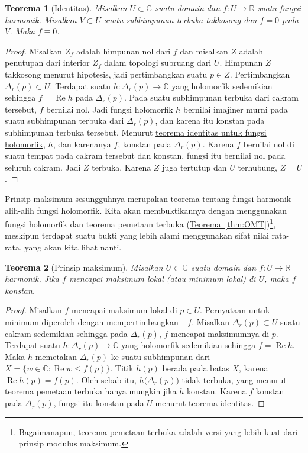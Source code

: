 \documentclass[12pt,openany]{book}
\renewcommand{\Re}{\operatorname{Re}}
\newcommand{\C}{{\mathbb{C}}}
\newcommand{\R}{{\mathbb{R}}}
\theoremstyle{plain}
\newtheorem{thm}{Teorema}[section]
\theoremstyle{remark}
\theoremstyle{definition}
\theoremstyle{exercise}
\theoremstyle{example}
\newcommand{\thmref}[1]{\hyperref[#1]{Teorema~\ref*{#1}}}
\begin{document}
\begin{thm}[Identitas]
Misalkan $U \subset \C$ suatu domain dan $f \colon U \to \R$ suatu fungsi harmonik.
Misalkan $V \subset U$ suatu subhimpunan terbuka takkosong dan $f = 0$ pada $V$. Maka $f
\equiv 0$.
\end{thm}

\begin{proof}
Misalkan $Z_f$ adalah himpunan nol dari $f$ dan misalkan $Z$ adalah penutupan dari interior
$Z_f$ dalam topologi subruang dari $U$.
Himpunan $Z$ takkosong menurut hipotesis, jadi
pertimbangkan suatu $p \in Z$. Pertimbangkan $\Delta_r(p) \subset U$.
Terdapat suatu $h \colon \Delta_r(p) \to \C$ yang holomorfik
sedemikian sehingga $f = \Re h$ pada $\Delta_r(p)$.
Pada suatu subhimpunan terbuka dari cakram tersebut, $f$ bernilai nol.
Jadi fungsi holomorfik $h$ bernilai imajiner murni pada
suatu subhimpunan terbuka dari $\Delta_r(p)$, dan karena itu konstan pada subhimpunan terbuka tersebut.
Menurut \hyperref[thm:identity]{teorema identitas untuk fungsi holomorfik},
$h$, dan karenanya $f$, konstan
pada $\Delta_r(p)$.
Karena $f$ bernilai nol di suatu tempat pada
cakram tersebut dan konstan, fungsi itu bernilai nol pada seluruh cakram.
Jadi $Z$ terbuka.
Karena $Z$ juga tertutup dan $U$ terhubung, $Z=U$.
\end{proof}

Prinsip maksimum sesungguhnya merupakan teorema tentang fungsi harmonik alih-alih
fungsi holomorfik. Kita akan membuktikannya dengan menggunakan fungsi holomorfik
dan teorema pemetaan terbuka (\thmref{thm:OMT})\footnote{%
Bagaimanapun, teorema pemetaan terbuka adalah
versi yang lebih kuat dari prinsip modulus maksimum.},
meskipun terdapat suatu bukti yang lebih alami menggunakan sifat nilai rata-rata,
yang akan kita lihat nanti.

\begin{thm}[Prinsip maksimum]
%
Misalkan $U \subset \C$ suatu domain dan $f \colon U \to \R$
harmonik. Jika $f$ mencapai maksimum lokal (atau minimum lokal) di $U$, maka $f$ konstan.
\end{thm}

\begin{proof}
Misalkan $f$ mencapai maksimum lokal di $p \in U$.
Pernyataan untuk minimum diperoleh dengan mempertimbangkan $-f$.
Misalkan $\Delta_r(p) \subset U$
suatu cakram sedemikian sehingga
pada $\Delta_r(p)$,
$f$ mencapai maksimumnya di $p$.
Terdapat suatu $h \colon \Delta_r(p) \to \C$ yang holomorfik
sedemikian sehingga $f = \Re h$.
Maka $h$ memetakan
$\Delta_r(p)$ ke suatu subhimpunan dari $X = \bigl\{ w \in \C : \Re w \leq f(p) \bigr\}$.
Titik $h(p)$ berada pada batas $X$, karena $\Re h(p)= f(p)$. Oleh sebab itu,
$h\bigl(\Delta_r(p)\bigr)$ tidak terbuka, yang menurut teorema pemetaan terbuka hanya mungkin jika $h$
konstan. Karena $f$ konstan pada $\Delta_r(p)$, fungsi itu konstan pada $U$ menurut
teorema identitas.
\end{proof}
\end{document}
